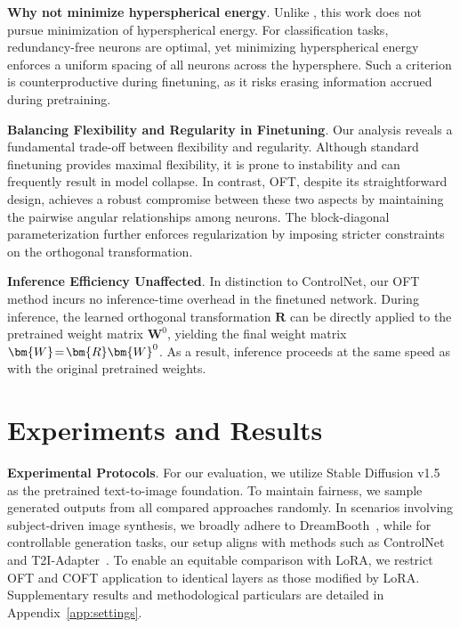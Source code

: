 \textbf{Why not minimize hyperspherical energy}. Unlike \cite{liu2021orthogonal}, this work does not pursue minimization of hyperspherical energy. For classification tasks, redundancy-free neurons are optimal, yet minimizing hyperspherical energy enforces a uniform spacing of all neurons across the hypersphere. Such a criterion is counterproductive during finetuning, as it risks erasing information accrued during pretraining.

\textbf{Balancing Flexibility and Regularity in Finetuning}. Our analysis reveals a fundamental trade-off between flexibility and regularity. Although standard finetuning provides maximal flexibility, it is prone to instability and can frequently result in model collapse. In contrast, OFT, despite its straightforward design, achieves a robust compromise between these two aspects by maintaining the pairwise angular relationships among neurons. The block-diagonal parameterization further enforces regularization by imposing stricter constraints on the orthogonal transformation.

\textbf{Inference Efficiency Unaffected}. In distinction to ControlNet, our OFT method incurs no inference-time overhead in the finetuned network. During inference, the learned orthogonal transformation $\bm{R}$ can be directly applied to the pretrained weight matrix $\bm{W}^0$, yielding the final weight matrix $\thickmuskip=2mu \medmuskip=2mu \bm{W}=\bm{R}\bm{W}^0$. As a result, inference proceeds at the same speed as with the original pretrained weights.

\section{Experiments and Results}

\textbf{Experimental Protocols}. For our evaluation, we utilize Stable Diffusion v1.5~\cite{rombach2022high} as the pretrained text-to-image foundation. To maintain fairness, we sample generated outputs from all compared approaches randomly. In scenarios involving subject-driven image synthesis, we broadly adhere to DreamBooth~\cite{ruiz2023dreambooth}, while for controllable generation tasks, our setup aligns with methods such as ControlNet~\cite{zhang2023adding} and T2I-Adapter~\cite{mou2023t2i}. To enable an equitable comparison with LoRA, we restrict OFT and COFT application to identical layers as those modified by LoRA. Supplementary results and methodological particulars are detailed in Appendix~\ref{app:settings}.

